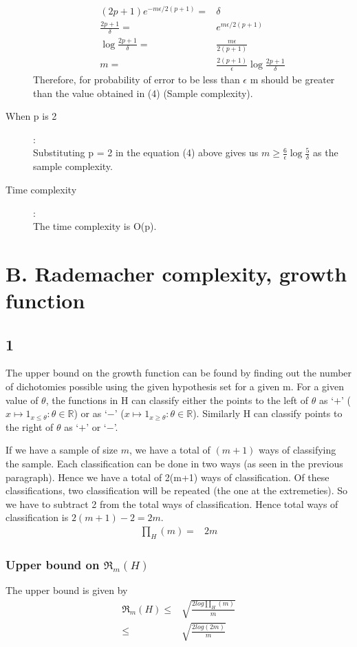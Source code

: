 \documentclass{article}
\begin{document}
\begin{description}
    \begin{align}
      (2p+1)e^{-m\epsilon/2(p+1)} = & \delta\\
      \frac{2p+1}{\delta} = & e^{m\epsilon/2(p+1)}\\
      \log{\frac{2p+1}{\delta}} = & \frac{m\epsilon}{2(p+1)}\\
      m = & \frac{2(p+1)}{\epsilon} \log{\frac{2p+1}{\delta}}
    \end{align}
    Therefore, for probability of error to be less than \(\epsilon\) m should be greater than the value obtained in (4) (Sample complexity).
  \item[When p is 2]:\\
    Substituting p = 2 in the equation (4) above gives us \(m \ge \frac{6}{\epsilon} \log{\frac{5}{\delta}}\) as the sample complexity.
  \item[Time complexity]:\\
    The time complexity is O(p).
\end{description}

\newpage
\section*{B. Rademacher complexity, growth function}
\subsection*{1}

The upper bound on the growth function can be found by finding out the number of dichotomies possible using the given hypothesis set for a given m.  For a given value of \( \theta \), the functions in H can classify either the points to the left of \(\theta\) as `\( + \)' (\( x \mapsto 1_{x \le \theta} : \theta \in \mathbb{R} \)) or as `\( - \)' (\( x \mapsto 1_{x \ge \theta} : \theta \in \mathbb{R} \)).  Similarly H can classify points to the right of \( \theta \) as `\( + \)' or `\( - \)'.

If we have a sample of size \(m\), we have a total of \((m+1)\) ways of classifying the sample.  Each classification can be done in two ways (as seen in the previous paragraph).  Hence we have a total of 2(m+1) ways of classification.  Of these classifications, two classification will be repeated (the one at the extremeties).  So we have to subtract 2 from the total ways of classification.  Hence total ways of classification is \(  2(m+1) - 2 = 2m\).
\begin{align*}
  \prod_{H}(m) = & 2m
\end{align*}

\subsubsection*{Upper bound on \( \mathfrak{R}_{m}(H)\)}

The upper bound is given by 
\begin{align*}
  \mathfrak{R}_{m}(H) \le & \sqrt{\frac{2log\prod_{H}(m)}{m}}\\
  \le & \sqrt{\frac{2log(2m)}{m}}
\end{align*}
\end{document}
